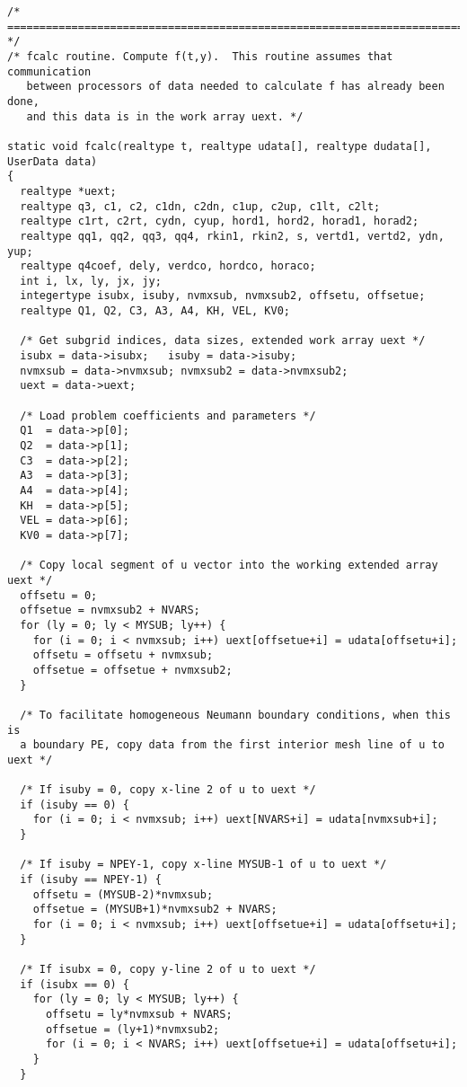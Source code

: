\begin{verbatim}
/* ======================================================================= */
/* fcalc routine. Compute f(t,y).  This routine assumes that communication 
   between processors of data needed to calculate f has already been done,
   and this data is in the work array uext. */

static void fcalc(realtype t, realtype udata[], realtype dudata[], UserData data)
{
  realtype *uext;
  realtype q3, c1, c2, c1dn, c2dn, c1up, c2up, c1lt, c2lt;
  realtype c1rt, c2rt, cydn, cyup, hord1, hord2, horad1, horad2;
  realtype qq1, qq2, qq3, qq4, rkin1, rkin2, s, vertd1, vertd2, ydn, yup;
  realtype q4coef, dely, verdco, hordco, horaco;
  int i, lx, ly, jx, jy;
  integertype isubx, isuby, nvmxsub, nvmxsub2, offsetu, offsetue;
  realtype Q1, Q2, C3, A3, A4, KH, VEL, KV0;

  /* Get subgrid indices, data sizes, extended work array uext */
  isubx = data->isubx;   isuby = data->isuby;
  nvmxsub = data->nvmxsub; nvmxsub2 = data->nvmxsub2;
  uext = data->uext;

  /* Load problem coefficients and parameters */
  Q1  = data->p[0];
  Q2  = data->p[1];
  C3  = data->p[2];
  A3  = data->p[3];
  A4  = data->p[4];
  KH  = data->p[5];
  VEL = data->p[6];
  KV0 = data->p[7];

  /* Copy local segment of u vector into the working extended array uext */
  offsetu = 0;
  offsetue = nvmxsub2 + NVARS;
  for (ly = 0; ly < MYSUB; ly++) {
    for (i = 0; i < nvmxsub; i++) uext[offsetue+i] = udata[offsetu+i];
    offsetu = offsetu + nvmxsub;
    offsetue = offsetue + nvmxsub2;
  }

  /* To facilitate homogeneous Neumann boundary conditions, when this is
  a boundary PE, copy data from the first interior mesh line of u to uext */

  /* If isuby = 0, copy x-line 2 of u to uext */
  if (isuby == 0) {
    for (i = 0; i < nvmxsub; i++) uext[NVARS+i] = udata[nvmxsub+i];
  }

  /* If isuby = NPEY-1, copy x-line MYSUB-1 of u to uext */
  if (isuby == NPEY-1) {
    offsetu = (MYSUB-2)*nvmxsub;
    offsetue = (MYSUB+1)*nvmxsub2 + NVARS;
    for (i = 0; i < nvmxsub; i++) uext[offsetue+i] = udata[offsetu+i];
  }

  /* If isubx = 0, copy y-line 2 of u to uext */
  if (isubx == 0) {
    for (ly = 0; ly < MYSUB; ly++) {
      offsetu = ly*nvmxsub + NVARS;
      offsetue = (ly+1)*nvmxsub2;
      for (i = 0; i < NVARS; i++) uext[offsetue+i] = udata[offsetu+i];
    }
  }


\end{verbatim}
